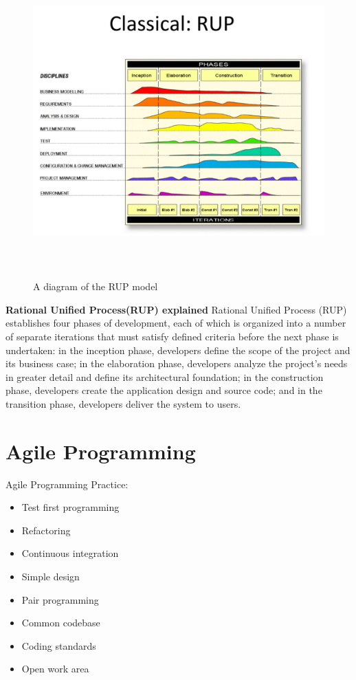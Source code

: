 \documentclass[a4paper]{report}
\begin{document}
\begin{figure}[h]
\begin{center} 
    \includegraphics[scale=0.8,width = 15cm, height = 12cm]{images/RUP.pdf}
    \caption{A diagram of the RUP model}
\end{center}
\end{figure}

\textbf{Rational Unified Process(RUP) explained \newline} 
Rational Unified Process (RUP) establishes four phases of development, each of which is organized into a number of separate iterations that must satisfy defined criteria before the next phase is undertaken: in the inception phase, developers define the scope of the project and its business case; in the elaboration phase, developers analyze the project's needs in greater detail and define its architectural foundation; in the construction phase, developers create the application design and source code; and in the transition phase, developers deliver the system to users. 


\section{Agile Programming}
Agile Programming Practice:
\begin{itemize}
\item Test first programming
\item Refactoring
\item Continuous integration
\item Simple design
\item Pair programming
\item Common codebase
\item Coding standards
\item Open work area
\end{itemize}
\end{document}
